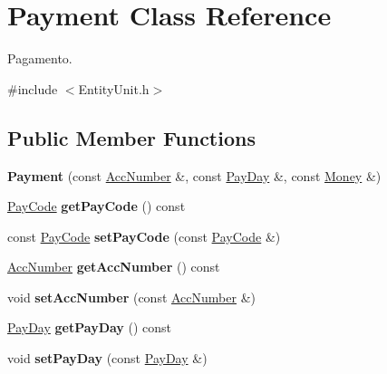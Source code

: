 \hypertarget{classPayment}{\section{Payment Class Reference}
\label{classPayment}
}


Pagamento.  




{\ttfamily \#include $<$Entity\-Unit.\-h$>$}

\subsection*{Public Member Functions}
\begin{DoxyCompactItemize}
\item 
\hypertarget{classPayment_a91b7742c5f9b4617e4a3bce6507cce49}{{\bfseries Payment} (const \hyperlink{classAccNumber}{Acc\-Number} \&, const \hyperlink{classPayDay}{Pay\-Day} \&, const \hyperlink{classMoney}{Money} \&)}\label{classPayment_a91b7742c5f9b4617e4a3bce6507cce49}

\item 
\hypertarget{classPayment_a1d71998fa33e757bb350eb40895865ae}{\hyperlink{classPayCode}{Pay\-Code} {\bfseries get\-Pay\-Code} () const }\label{classPayment_a1d71998fa33e757bb350eb40895865ae}

\item 
\hypertarget{classPayment_adf458db6331e53948a473a04a0d622a4}{const \hyperlink{classPayCode}{Pay\-Code} {\bfseries set\-Pay\-Code} (const \hyperlink{classPayCode}{Pay\-Code} \&)}\label{classPayment_adf458db6331e53948a473a04a0d622a4}

\item 
\hypertarget{classPayment_a66c51330aef2e045884e25618a194904}{\hyperlink{classAccNumber}{Acc\-Number} {\bfseries get\-Acc\-Number} () const }\label{classPayment_a66c51330aef2e045884e25618a194904}

\item 
\hypertarget{classPayment_a5d0e83f83f090acf4b33bc81f5391ca0}{void {\bfseries set\-Acc\-Number} (const \hyperlink{classAccNumber}{Acc\-Number} \&)}\label{classPayment_a5d0e83f83f090acf4b33bc81f5391ca0}

\item 
\hypertarget{classPayment_a22ee22d04f3f5757f115386aa3337c51}{\hyperlink{classPayDay}{Pay\-Day} {\bfseries get\-Pay\-Day} () const }\label{classPayment_a22ee22d04f3f5757f115386aa3337c51}

\item 
\hypertarget{classPayment_aaadd94e11ab24629d536809da691efc5}{void {\bfseries set\-Pay\-Day} (const \hyperlink{classPayDay}{Pay\-Day} \&)}\label{classPayment_aaadd94e11ab24629d536809da691efc5}


\end{DoxyCompactItemize}
